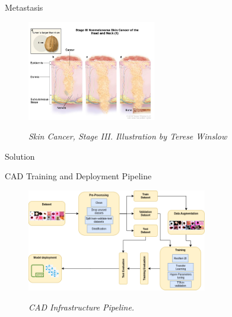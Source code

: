 \documentclass[dvipsnames,mathserif]{beamer}
\begin{document}
{\begin{frame}
    \end{frame}



    \begin{frame}

    \large Metastasis
      \vspace{0.25cm}

      \footnotesize
    \begin{figure}[H] \centering
      \includegraphics[width=0.5\textwidth]{images/stage3-skin-cancer.jpg}
      \caption[Skin Cancer, Stage III]{\textit{Skin Cancer, Stage III. Illustration by
    Terese Winslow}} {\label{fig:stage3-skin-canceer}} \end{figure}

    \end{frame}

    \begin{frame}
      \begin{center}
        \Huge Solution
      \end{center}
    \end{frame}


    \begin{frame}

      \large CAD Training and Deployment Pipeline
      \vspace{0.25cm}

      \begin{figure}[H]
        \centering
        \includegraphics[width=0.7\textwidth]{images/Pipeline.drawio.png}
        \caption[CAD Infrastructure Pipeline]{\textit{CAD Infrastructure Pipeline.}}
        {\label{fig:cad-infrastructure-training-system}}
      \end{figure}


\end{frame}}
\end{document}
